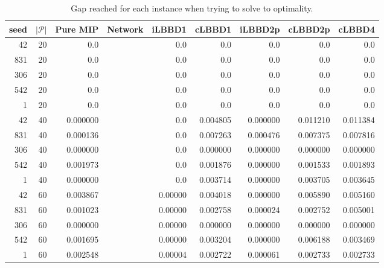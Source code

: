 \begin{table*}
    \centering
    \caption{Gap reached for each instance when trying to solve to optimality.}
    \begin{tabular}{rrrrrrrrr} \toprule
        seed & $|\mathcal{P}|$ & Pure MIP & Network & iLBBD1 & cLBBD1 & iLBBD2p & cLBBD2p & cLBBD4 \\\midrule
        42     &       20 & 0.0 &&    0.0  &   0.0   &   0.0   &   0.0   &   0.0 \\
        831      &      20 & 0.0 &&    0.0  &   0.0  &    0.0   &   0.0   &   0.0\\
        306      &      20 & 0.0 &&    0.0  &   0.0  &    0.0   &   0.0   &   0.0\\
        542      &      20  &0.0 &&    0.0  &   0.0  &    0.0  &    0.0   &   0.0\\
        1       &     20 & 0.0   &&  0.0  &   0.0   &   0.0   &   0.0   &   0.0\\\midrule
       42       &     40&  0.000000 &&    0.0&  0.004805&  0.000000 & 0.011210 & 0.011384\\
       831      &      40 & 0.000136 &&    0.0&  0.007263 & 0.000476&  0.007375&  0.007816\\
        306     &       40 & 0.000000 &&    0.0&  0.000000&  0.000000 & 0.000000&  0.000000\\
       542      &      40&  0.001973  &&   0.0&  0.001876  &0.000000 & 0.001533 & 0.001893\\
         1      &      40 & 0.000000  &&   0.0 & 0.003714 & 0.000000 & 0.003705 & 0.003645\\\midrule
        42       &     60&  0.003867&&  0.00000&  0.004018 & 0.000000 & 0.005890 & 0.005160 \\
        831      &      60&  0.001023&&  0.00000&  0.002758&  0.000024&  0.002752&  0.005001\\
        306      &      60&  0.000000&&  0.00000&  0.000000&  0.000000&  0.000000 & 0.000000\\
        542      &      60 & 0.001695&&  0.00000&  0.003204&  0.000000&  0.006188 & 0.003469\\
        1        &    60 & 0.002548&&  0.00004&  0.002722 & 0.000061 & 0.002733 & 0.002733\\
      \bottomrule
    \end{tabular}
\end{table*}
